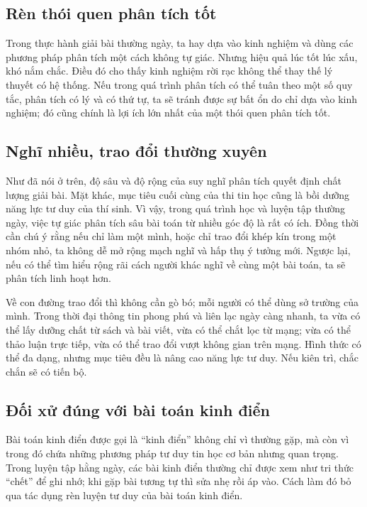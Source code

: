 \documentclass[11pt]{article}
\begin{document}
\subsection{Rèn thói quen phân tích tốt}

Trong thực hành giải bài thường ngày, ta hay dựa vào kinh nghiệm và dùng các
phương pháp phân tích một cách không tự giác. Nhưng hiệu quả lúc tốt lúc xấu,
khó nắm chắc. Điều đó cho thấy kinh nghiệm rời rạc không thể thay thế lý
thuyết có hệ thống. Nếu trong quá trình phân tích có thể tuân theo một số quy
tắc, phân tích có lý và có thứ tự, ta sẽ tránh được sự bất ổn do chỉ dựa vào
kinh nghiệm; đó cũng chính là lợi ích lớn nhất của một thói quen phân tích tốt.

\subsection{Nghĩ nhiều, trao đổi thường xuyên}

Như đã nói ở trên, độ sâu và độ rộng của suy nghĩ phân tích quyết định chất
lượng giải bài. Mặt khác, mục tiêu cuối cùng của thi tin học cũng là bồi dưỡng
năng lực tư duy của thí sinh. Vì vậy, trong quá trình học và luyện tập thường
ngày, việc tự giác phân tích sâu bài toán từ nhiều góc độ là rất có ích. Đồng
thời cần chú ý rằng nếu chỉ làm một mình, hoặc chỉ trao đổi khép kín trong một
nhóm nhỏ, ta không dễ mở rộng mạch nghĩ và hấp thụ ý tưởng mới. Ngược lại, nếu
có thể tìm hiểu rộng rãi cách người khác nghĩ về cùng một bài toán, ta sẽ phân
tích linh hoạt hơn.

Về con đường trao đổi thì không cần gò bó; mỗi người có thể dùng sở trường của
mình. Trong thời đại thông tin phong phú và liên lạc ngày càng nhanh, ta vừa
có thể lấy dưỡng chất từ sách và bài viết, vừa có thể chắt lọc từ mạng; vừa có
thể thảo luận trực tiếp, vừa có thể trao đổi vượt không gian trên mạng. Hình
thức có thể đa dạng, nhưng mục tiêu đều là nâng cao năng lực tư duy. Nếu kiên
trì, chắc chắn sẽ có tiến bộ.

\subsection{Đối xử đúng với bài toán kinh điển}

Bài toán kinh điển được gọi là ``kinh điển'' không chỉ vì thường gặp, mà còn
vì trong đó chứa những phương pháp tư duy tin học cơ bản nhưng quan trọng.
Trong luyện tập hằng ngày, các bài kinh điển thường chỉ được xem như tri thức
``chết'' để ghi nhớ; khi gặp bài tương tự thì sửa nhẹ rồi áp vào. Cách làm đó
bỏ qua tác dụng rèn luyện tư duy của bài toán kinh điển.
\end{document}
